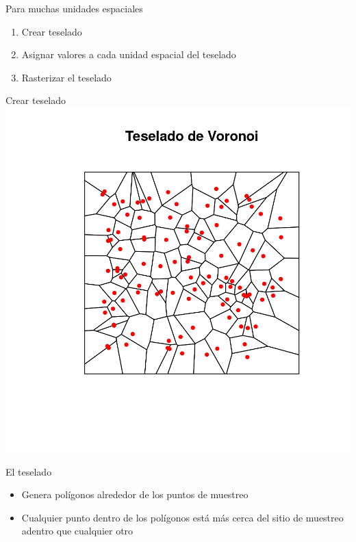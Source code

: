 \documentclass[
  11pt,
  ignorenonframetext,
]{beamer}
\providecommand{\tightlist}{%
  \setlength{\itemsep}{0pt}\setlength{\parskip}{0pt}}
\begin{document}
\begin{frame}{Para muchas unidades espaciales}
\protect\hypertarget{para-muchas-unidades-espaciales}{}
\begin{enumerate}
\tightlist
\item
  Crear teselado
\item
  Asignar valores a cada unidad espacial del teselado
\item
  Rasterizar el teselado
\end{enumerate}
\end{frame}

\begin{frame}{Crear teselado}
\protect\hypertarget{crear-teselado}{}
\includegraphics{Interpolacion/Voro-1.png}
\end{frame}

\begin{frame}{El teselado}
\protect\hypertarget{el-teselado}{}
\begin{itemize}
\item
  Genera polígonos alrededor de los puntos de muestreo
\item
  Cualquier punto dentro de los polígonos está más cerca del sitio de
  muestreo adentro que cualquier otro
\end{itemize}
\end{frame}
\end{document}
